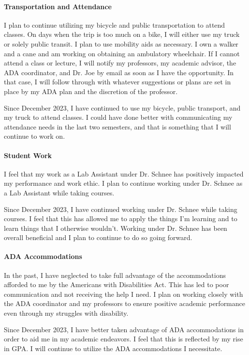 \documentclass[12pt]{article}
\begin{document}
\paragraph{Transportation and Attendance}
I plan to continue utilizing my bicycle and public transportation to attend classes.
On days when the trip is too much on a bike, 
I will either use my truck or solely public transit.
I plan to use mobility aids as necessary.
I own a walker and a cane and am working on obtaining an ambulatory wheelchair.
If I cannot attend a class or lecture, I will notify 
my professors, my academic advisor, the ADA coordinator, and Dr. Joe by email as
soon as I have the opportunity.
In that case, I will follow through with whatever suggestions or plans are set 
in place by my ADA plan and the discretion of the professor.

Since December 2023, I have continued to use my bicycle, public transport, and my
truck to attend classes. 
I could have done better with communicating my attendance needs in the last
two semesters, and that is something that I will continue to work on.

\paragraph{Student Work}
I feel that my work as a Lab Assistant under Dr. Schnee has positively impacted 
my performance and work ethic.
I plan to continue working under Dr. Schnee as a Lab Assistant while taking courses.

Since December 2023, I have continued working under Dr. Schnee while taking courses.
I feel that this has allowed me to apply the things I'm learning and to learn things
that I otherwise wouldn't.
Working under Dr. Schnee has been overall beneficial and I plan to continue to do so
going forward.

\paragraph{ADA Accommodations}
In the past, I have neglected to take full advantage of the accommodations afforded to me 
by the Americans with Disabilities Act.
This has led to poor communication and not receiving the help I need.
I plan on working closely with the ADA coordinator and my professors to ensure
positive academic performance even through my struggles with disability.

Since December 2023, I have better taken advantage of ADA accommodations in order
to aid me in my academic endeavors.
I feel that this is reflected by my rise in GPA.
I will continue to utilize the ADA accommodations I necessitate.
\end{document}
